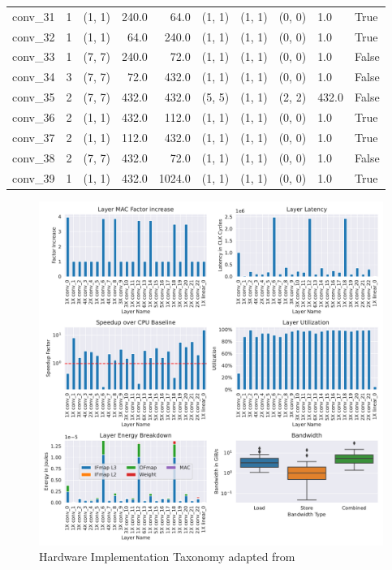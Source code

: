 \begin{center}
\begin{tabular}{lrlrrlllll}
        conv\_31 &      1 &      (1, 1) &  240.0 &    64.0 &  (1, 1) &  (1, 1) &  (0, 0) &    1.0 &   True \\
        conv\_32 &      1 &      (1, 1) &   64.0 &   240.0 &  (1, 1) &  (1, 1) &  (0, 0) &    1.0 &   True \\
        conv\_33 &      1 &      (7, 7) &  240.0 &    72.0 &  (1, 1) &  (1, 1) &  (0, 0) &    1.0 &  False \\
        conv\_34 &      3 &      (7, 7) &   72.0 &   432.0 &  (1, 1) &  (1, 1) &  (0, 0) &    1.0 &  False \\
        conv\_35 &      2 &      (7, 7) &  432.0 &   432.0 &  (5, 5) &  (1, 1) &  (2, 2) &  432.0 &  False \\
        conv\_36 &      2 &      (1, 1) &  432.0 &   112.0 &  (1, 1) &  (1, 1) &  (0, 0) &    1.0 &   True \\
        conv\_37 &      2 &      (1, 1) &  112.0 &   432.0 &  (1, 1) &  (1, 1) &  (0, 0) &    1.0 &   True \\
        conv\_38 &      2 &      (7, 7) &  432.0 &    72.0 &  (1, 1) &  (1, 1) &  (0, 0) &    1.0 &  False \\
        conv\_39 &      1 &      (1, 1) &  432.0 &  1024.0 &  (1, 1) &  (1, 1) &  (0, 0) &    1.0 &   True \\
        \bottomrule
        \end{tabular}
\end{center}

\begin{figure}[ht]
    \centering
    \includegraphics[scale=0.6]{Plots/networks/resnet50.pdf}
    \caption{Hardware Implementation Taxonomy adapted from \cite{maestro}}
    \label{fig:hw_taxonomy}
\end{figure}

